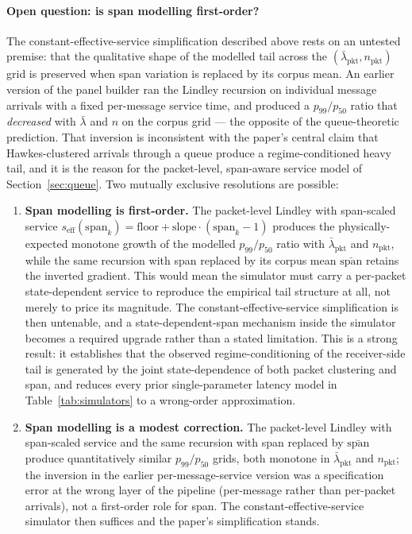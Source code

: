 \documentclass[11pt]{article}
\begin{document}
\paragraph{Open question: is span modelling first-order?}
The constant-effective-service simplification described above rests on an untested premise: that the qualitative shape of the modelled tail across the $(\bar\lambda_{\mathrm{pkt}}, n_{\mathrm{pkt}})$ grid is preserved when span variation is replaced by its corpus mean. An earlier version of the panel builder ran the Lindley recursion on individual message arrivals with a fixed per-message service time, and produced a $p_{99}/p_{50}$ ratio that \emph{decreased} with $\bar\lambda$ and $n$ on the corpus grid --- the opposite of the queue-theoretic prediction. That inversion is inconsistent with the paper's central claim that Hawkes-clustered arrivals through a queue produce a regime-conditioned heavy tail, and it is the reason for the packet-level, span-aware service model of Section~\ref{sec:queue}. Two mutually exclusive resolutions are possible:

\begin{enumerate}
    \item \textbf{Span modelling is first-order.} The packet-level Lindley with span-scaled service $s_{\mathrm{eff}}(\text{span}_k) = \text{floor} + \text{slope}\cdot(\text{span}_k - 1)$ produces the physically-expected monotone growth of the modelled $p_{99}/p_{50}$ ratio with $\bar\lambda_{\mathrm{pkt}}$ and $n_{\mathrm{pkt}}$, while the same recursion with span replaced by its corpus mean $\bar{\text{span}}$ retains the inverted gradient. This would mean the simulator must carry a per-packet state-dependent service to reproduce the empirical tail structure at all, not merely to price its magnitude. The constant-effective-service simplification is then untenable, and a state-dependent-span mechanism inside the simulator becomes a required upgrade rather than a stated limitation. This is a strong result: it establishes that the observed regime-conditioning of the receiver-side tail is generated by the joint state-dependence of both packet clustering and span, and reduces every prior single-parameter latency model in Table~\ref{tab:simulators} to a wrong-order approximation.

    \item \textbf{Span modelling is a modest correction.} The packet-level Lindley with span-scaled service and the same recursion with span replaced by $\bar{\text{span}}$ produce quantitatively similar $p_{99}/p_{50}$ grids, both monotone in $\bar\lambda_{\mathrm{pkt}}$ and $n_{\mathrm{pkt}}$; the inversion in the earlier per-message-service version was a specification error at the wrong layer of the pipeline (per-message rather than per-packet arrivals), not a first-order role for span. The constant-effective-service simulator then suffices and the paper's simplification stands.
\end{enumerate}
\end{document}
